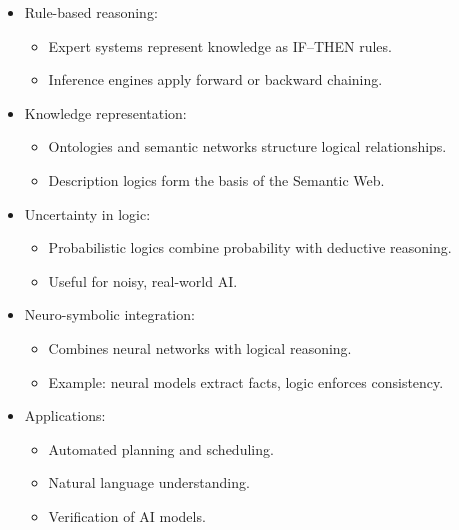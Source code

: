 \documentclass[
  letterpaper,
  DIV=11,
  numbers=noendperiod]{scrreprt}
\providecommand{\tightlist}{%
  \setlength{\itemsep}{0pt}\setlength{\parskip}{0pt}}
\begin{document}
\begin{itemize}
\item
  Rule-based reasoning:

  \begin{itemize}
  \tightlist
  \item
    Expert systems represent knowledge as IF--THEN rules.
  \item
    Inference engines apply forward or backward chaining.
  \end{itemize}
\item
  Knowledge representation:

  \begin{itemize}
  \tightlist
  \item
    Ontologies and semantic networks structure logical relationships.
  \item
    Description logics form the basis of the Semantic Web.
  \end{itemize}
\item
  Uncertainty in logic:

  \begin{itemize}
  \tightlist
  \item
    Probabilistic logics combine probability with deductive reasoning.
  \item
    Useful for noisy, real-world AI.
  \end{itemize}
\item
  Neuro-symbolic integration:

  \begin{itemize}
  \tightlist
  \item
    Combines neural networks with logical reasoning.
  \item
    Example: neural models extract facts, logic enforces consistency.
  \end{itemize}
\item
  Applications:

  \begin{itemize}
  \tightlist
  \item
    Automated planning and scheduling.
  \item
    Natural language understanding.
  \item
    Verification of AI models.
  \end{itemize}
\end{itemize}
\end{document}
